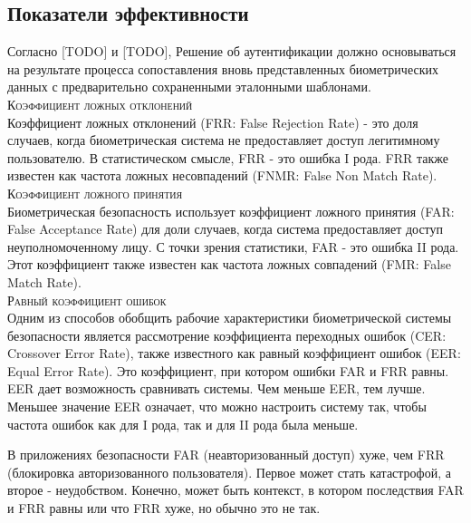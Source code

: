 \documentclass[12pt]{article}
\begin{document}
    \newpage


    \subsection{Показатели эффективности}
    \label{sec:Overview:Metrics}

    \par Согласно [TODO] и [TODO], Решение об аутентификации должно основываться на результате процесса сопоставления вновь представленных биометрических данных с предварительно сохраненными эталонными шаблонами. \\

    \noident\textsc{Коэффициент ложных отклонений} \\
    Коэффициент ложных отклонений (FRR: False Rejection Rate) - это доля случаев, когда биометрическая система не предоставляет доступ легитимному пользователю. В статистическом смысле, FRR - это ошибка I рода. FRR также известен как частота ложных несовпадений (FNMR: False Non Match Rate). \\

    \noident\textsc{Коэффициент ложного принятия} \\
    \noident Биометрическая безопасность использует коэффициент ложного принятия (FAR: False Acceptance Rate) для доли случаев, когда система предоставляет доступ неуполномоченному лицу. С точки зрения статистики, FAR - это ошибка II рода. Этот коэффициент также известен как частота ложных совпадений (FMR: False Match Rate). \\

    \noident\textsc{Равный коэффициент ошибок} \\
    \noident Одним из способов обобщить рабочие характеристики биометрической системы безопасности является рассмотрение коэффициента переходных ошибок (CER: Crossover Error Rate), также известного как равный коэффициент ошибок (EER: Equal Error Rate). Это коэффициент, при котором ошибки FAR и FRR равны. EER дает возможность сравнивать системы. Чем меньше EER, тем лучше. Меньшее значение EER означает, что можно настроить систему так, чтобы частота ошибок как для I рода, так и для II рода была меньше. \\

    \par В приложениях безопасности FAR (неавторизованный доступ) хуже, чем FRR (блокировка авторизованного пользователя). Первое может стать катастрофой, а второе - неудобством. Конечно, может быть контекст, в котором последствия FAR и FRR равны или что FRR хуже, но обычно это не так. \\
\end{document}
